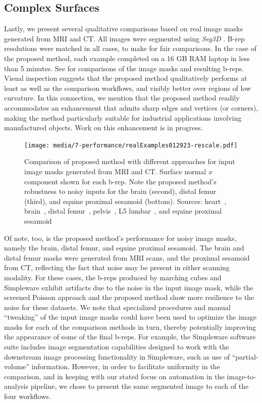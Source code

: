 \subsection{Complex Surfaces}
\label{Complex Surfaces}

Lastly, we present several qualitative comparisons based on real image masks generated from MRI and CT.  All images were segmented using \textit{Seg3D} \cite{Seg3D}.  B-rep resolutions were matched in all cases, to make for fair comparisons.  In the case of the proposed method, each example completed on a 16 GB RAM laptop in less than 5 minutes. See  for comparisons of the image masks and resulting b-reps.  Visual inspection suggests that the proposed method qualitatively performs at least as well as the comparison workflows, and visibly better over regions of low curvature.   In this connection, we mention that the proposed method readily accommodates an enhancement that admits sharp edges and vertices (or corners), making the method particularly suitable for industrial applications involving manufactured objects.  Work on this enhancement is in progress.  
\begin{figure}[h!]
	\centering
	 \texttt{[image: media/7-performance/realExamples012923-rescale.pdf]}
	\caption{{Comparison of proposed method with different approaches for input image masks generated from MRI and CT. Surface normal $x$ component shown for each b-rep. Note the proposed method's robustness to noisy inputs for the brain (second), distal femur (third), and equine proximal sesamoid (bottom). Sources: heart~\cite{cvgg}, brain~\cite{marcus_2007}, distal femur~\cite{epperson_2013}, pelvis~\cite{clark_2013}, L5 lumbar~\cite{yao_2016}, and equine proximal sesamoid~\cite{shaffer2021}}}
	\label{fig:example-meshes}
\end{figure}

Of note, too, is the proposed method's performance for noisy image masks, namely the brain, distal femur, and equine proximal sesamoid. The brain and distal femur masks were generated from MRI scans, and the proximal sesamoid from CT, reflecting the fact that noise may be present in either scanning modality.  For these cases, the b-reps produced by marching cubes and Simpleware exhibit artifacts due to the noise in the input image mask, while the screened Poisson approach and the proposed method show more resilience to the noise for these datasets.  We note that specialized procedures and manual ``tweaking'' of the input image masks could have been used to optimize the image masks for each of the comparison methods in turn, thereby potentially improving the appearance of some of the final b-reps.  For example, the Simpleware software suite includes image segmentation capabilities designed to work with the downstream image processing functionality in Simpleware, such as use of ``partial-volume'' information.  However, in order to facilitate uniformity in the comparison, and in keeping with our stated focus on automation in the image-to-analysis pipeline, we chose to present the same segmented image to each of the four workflows.

